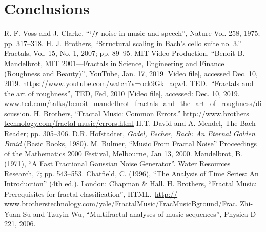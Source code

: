 \documentclass{article}
\begin{document}
\section{Conclusions}

\begin{thebibliography}{9}
    R. F. Voss and J. Clarke,
    ``$\sfrac 1 f$ noise in music and speech'',
    Nature Vol. 258, 1975; pp. 317--318.
    H. J. Brothers,
    ``Structural scaling in Bach's cello suite no. 3.''
    Fractals, Vol. 15, No. 1, 2007; pp. 89--95.
    MIT Video Production.
    ``Benoit B. Mandelbrot, MIT 2001---Fractals in Science, Engineering and Finance (Roughness and Beauty)'',
        YouTube, Jan. 17, 2019 [Video file],
    accessed Dec. 10, 2019.
    \url{https://www.youtube.com/watch?v=ock9Gk_aqw4}.
    TED.\
    ``Fractals and the art of roughness'',
    TED, Fed, 2010 [Video file],
    accessed: Dec. 10, 2019.
    \url{www.ted.com/talks/benoit_mandelbrot_fractals_and_the_art_of_roughness/discussion}.
\bibitem{5}
    H. Brothers,
    ``Fractal Music: Common Errors.''
    \url{http://www.brothers technology.com/fractal-music/errors.html}
\bibitem{6}
    H.T. David and A. Mendel,
    The Bach Reader; pp. 305--306.
    D.R. Hofstadter,
    \emph{Godel, Escher, Bach: An Eternal Golden Braid} (Basic Books, 1980).
\bibitem{8}
    M. Bulmer,
    ``Music From Fractal Noise''
    Proceedings of the Mathematics 2000 Festival, Melbourne, Jan 13, 2000.
\bibitem{9}
    Mandelbrot, B. (1971),
    ``A Fast Fractional Gaussian Noise Generator''.
    Water Resources Research, 7; pp. 543–553.
    Chatfield, C. (1996),
    ``The Analysis of Time Series: An Introduction'' (4th ed.).
    London: Chapman \& Hall.
    H. Brothers,
    ``Fractal Music: Prerequisites for fractal classification'', HTML.\
    \url{http:// www.brotherstechnology.com/yale/FractalMusic/FracMusicBground/Frac}.
\bibitem{12}
    Zhi-Yuan Su and Tzuyin Wu,
    ``Multifractal analyses of music sequences'',
    Physica D 221, 2006.
\end{thebibliography}
\end{document}

